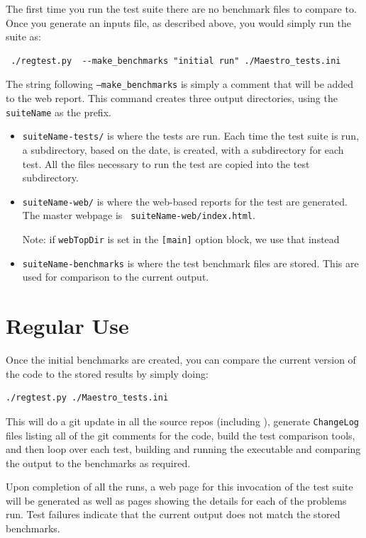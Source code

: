 The first time you run the test suite there are no benchmark files to
compare to.  Once you generate an inputs file, as described above, you
would simply run the suite as:
\begin{verbatim}
 ./regtest.py  --make_benchmarks "initial run" ./Maestro_tests.ini
\end{verbatim}
The string following {\tt --make\_benchmarks} is simply a comment that
will be added to the web report.  This command creates three output
directories, using the {\tt suiteName} as the prefix.
\begin{itemize}
\item {\tt suiteName-tests/} is where the tests are run.  Each time the
  test suite is run, a subdirectory, based on the date, is created,
  with a subdirectory for each test.  All the files necessary to run
  the test are copied into the test subdirectory.

\item {\tt suiteName-web/} is where the web-based reports for the test
  are generated.  The master webpage is {\tt
    suiteName-web/index.html}.

  Note: if {\tt webTopDir} is set in the {\tt [main]} option block, we
  use that instead

\item {\tt suiteName-benchmarks} is where the test benchmark files are
  stored.  This are used for comparison to the current output.
\end{itemize}



\section{Regular Use}

Once the initial benchmarks are created, you can compare the current
version of the code to the stored results by simply doing:
\begin{verbatim}
./regtest.py ./Maestro_tests.ini
\end{verbatim}
This will do a git update in all the source repos (including \boxlib),
generate {\tt ChangeLog} files listing all of the git comments for the
code, build the test comparison tools, and then loop over each test,
building and running the executable and comparing the output to the
benchmarks as required.

Upon completion of all the runs, a web page for this invocation of the
test suite will be generated as well as pages showing the details for
each of the problems run.  Test failures indicate that the current
output does not match the stored benchmarks.

